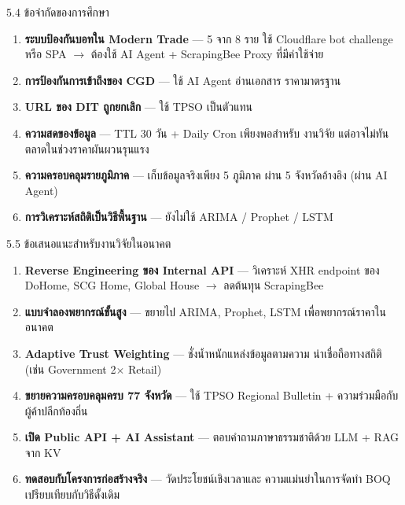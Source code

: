 \documentclass[aspectratio=169,11pt]{beamer}
\begin{document}
\begin{frame}{5.4 ข้อจำกัดของการศึกษา}
  \begin{enumerate}
    \item \textbf{ระบบป้องกันบอทใน Modern Trade} --- 5 จาก 8 ราย ใช้ Cloudflare
          bot challenge หรือ SPA $\to$ ต้องใช้ AI Agent + ScrapingBee Proxy
          ที่มีค่าใช้จ่าย
    \item \textbf{การป้องกันการเข้าถึงของ CGD} --- ใช้ AI Agent อ่านเอกสาร
          ราคามาตรฐาน
    \item \textbf{URL ของ DIT ถูกยกเลิก} --- ใช้ TPSO เป็นตัวแทน
    \item \textbf{ความสดของข้อมูล} --- TTL 30 วัน + Daily Cron เพียงพอสำหรับ
          งานวิจัย แต่อาจไม่ทันตลาดในช่วงราคาผันผวนรุนแรง
    \item \textbf{ความครอบคลุมรายภูมิภาค} --- เก็บข้อมูลจริงเพียง 5 ภูมิภาค
          ผ่าน 5 จังหวัดอ้างอิง (ผ่าน AI Agent)
    \item \textbf{การวิเคราะห์สถิติเป็นวิธีพื้นฐาน} --- ยังไม่ใช้ ARIMA / Prophet
          / LSTM
  \end{enumerate}
\end{frame}

\begin{frame}{5.5 ข้อเสนอแนะสำหรับงานวิจัยในอนาคต}
  \footnotesize
  \begin{enumerate}
    \item \textbf{Reverse Engineering ของ Internal API} --- วิเคราะห์ XHR endpoint
          ของ DoHome, SCG Home, Global House $\to$ ลดต้นทุน ScrapingBee
    \item \textbf{แบบจำลองพยากรณ์ขั้นสูง} --- ขยายไป ARIMA, Prophet, LSTM
          เพื่อพยากรณ์ราคาในอนาคต
    \item \textbf{Adaptive Trust Weighting} --- ชั่งน้ำหนักแหล่งข้อมูลตามความ
          น่าเชื่อถือทางสถิติ (เช่น Government 2$\times$ Retail)
    \item \textbf{ขยายความครอบคลุมครบ 77 จังหวัด} --- ใช้ TPSO Regional Bulletin
          + ความร่วมมือกับผู้ค้าปลีกท้องถิ่น
    \item \textbf{เปิด Public API + AI Assistant} --- ตอบคำถามภาษาธรรมชาติด้วย
          LLM + RAG จาก KV
    \item \textbf{ทดสอบกับโครงการก่อสร้างจริง} --- วัดประโยชน์เชิงเวลาและ
          ความแม่นยำในการจัดทำ BOQ เปรียบเทียบกับวิธีดั้งเดิม
  \end{enumerate}
\end{frame}
\end{document}
